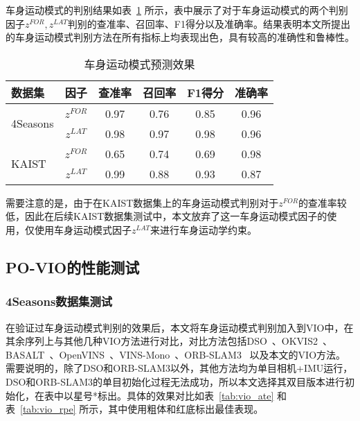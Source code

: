 车身运动模式的判别结果如表~\ref{tab:pose_detection} 所示，表中展示了对于车身运动模式的两个判别因子$z^{FOR},z^{LAT}$判别的查准率、召回率、F1得分以及准确率。结果表明本文所提出的车身运动模式判别方法在所有指标上均表现出色，具有较高的准确性和鲁棒性。

\begin{table}
\centering
\caption{车身运动模式预测效果}
\begin{tabular}{lccccc}
\toprule
数据集 &  因子  & 查准率  & 召回率  & F1得分 & 准确率  \\ \midrule
\multirow{2}{*}{4Seasons} & $z^{FOR}$ & 0.97 & 0.76 & 0.85 & 0.96 \\
                          & $z^{LAT}$ & 0.98 & 0.97 & 0.98 & 0.96 \\ \midrule
\multirow{2}{*}{KAIST}    & $z^{FOR}$ & 0.65 & 0.74 & 0.69 & 0.98 \\
                          & $z^{LAT}$ & 0.99 & 0.88 & 0.93 & 0.87 \\
\bottomrule
\end{tabular}
\label{tab:pose_detection}
\end{table}

需要注意的是，由于在KAIST数据集上的车身运动模式判别对于$z^{FOR}$的查准率较低，因此在后续KAIST数据集测试中，本文放弃了这一车身运动模式因子的使用，仅使用车身运动模式因子$z^{LAT}$来进行车身运动学约束。

\subsection{PO-VIO的性能测试}

\subsubsection{4Seasons数据集测试}
在验证过车身运动模式判别的效果后，本文将车身运动模式判别加入到VIO中，在其余序列上与其他几种VIO方法进行对比，对比方法包括DSO~\cite{von2018direct}、OKVIS2~\cite{leutenegger2022okvis2}、BASALT~\cite{usenko2019visual}、OpenVINS~\cite{Geneva2020ICRA}、VINS-Mono~\cite{qin2018vins}、ORB-SLAM3~\cite{campos2021orb} 以及本文的VIO方法。需要说明的，除了DSO和ORB-SLAM3以外，其他方法均为单目相机+IMU运行，DSO和ORB-SLAM3的单目初始化过程无法成功，所以本文选择其双目版本进行初始化，在表中以星号*标出。具体的效果对比如表~\ref{tab:vio_ate} 和表~\ref{tab:vio_rpe} 所示，其中使用粗体和红底标出最佳表现。

